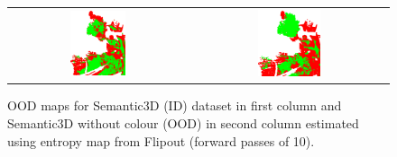 \begin{figure}[h!]
\begin{tabular}{cc}
            \includegraphics[width=0.33\textwidth, height=0.18\textheight]{images/ood_imgs/sem3d_of/ent/fout_sem3d_OOD_3.pdf}&
            \includegraphics[width=0.33\textwidth, height=0.18\textheight]{images/ood_imgs/sem3d_of/ent/fout_sem3d_of_OOD_3.pdf}\\
        \end{tabular}
        \caption{OOD maps for Semantic3D (ID) dataset in first column and Semantic3D without colour (OOD) in second column estimated using entropy map from Flipout (forward passes of 10).}
        \label{fig:fout_oodmap_sem3d_OF_ent}
    \end{figure} 
    \FloatBarrier

